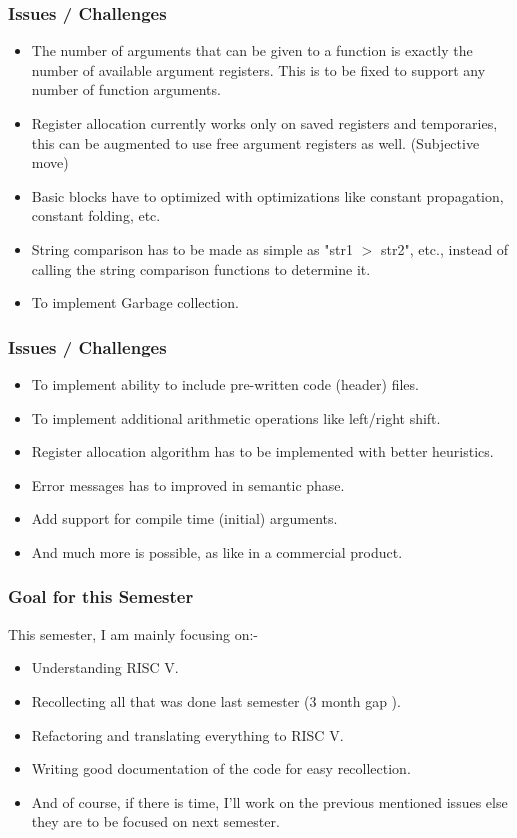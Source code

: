\documentclass{beamer}
\begin{document}
\begin{frame}[fragile]
  \frametitle{Issues / Challenges}
  \begin{itemize}
  \item The number of arguments that can be given to a function is exactly the number of available argument registers. This is to be fixed to support any number of function arguments.
  \pause
  \item Register allocation currently works only on saved registers and temporaries, this can be augmented to use free argument registers as well. (Subjective move)
  \pause
  \item Basic blocks have to optimized with optimizations like constant propagation, constant folding, etc.
  \pause
  \item String comparison has to be made as simple as "str1 $>$ str2", etc.,  instead of calling the string comparison functions to determine it.
  \pause
  \item To implement Garbage collection.
  \end{itemize}
\end{frame}
\begin{frame}
  \frametitle{Issues / Challenges}
  \begin{itemize}
  \item To implement ability to include pre-written code (header) files.
  \pause
  \item To implement additional arithmetic operations like left/right shift.
  \pause
  \item Register allocation algorithm has to be implemented with better heuristics.
  \pause
  \item Error messages has to improved in semantic phase. 
  \pause
  \item Add support for compile time (initial) arguments.
  \pause
  \item And much more is possible, as like in a commercial product.
  \end{itemize}
\end{frame}
\begin{frame}
  \frametitle{Goal for this Semester}
  This semester, I am mainly focusing on:-
  \begin{itemize}
    \pause
    \item Understanding RISC V.
    \pause 
    \item Recollecting all that was done last semester (3 month gap \Xey). %
    \pause
    \item Refactoring and translating everything to RISC V.
    \pause
    \item Writing good documentation of the code for easy recollection.
    \pause 
    \item And of course, if there is time, I'll work on the previous mentioned issues else they are to be focused on next semester.
  \end{itemize}
\end{frame}
\end{document}
